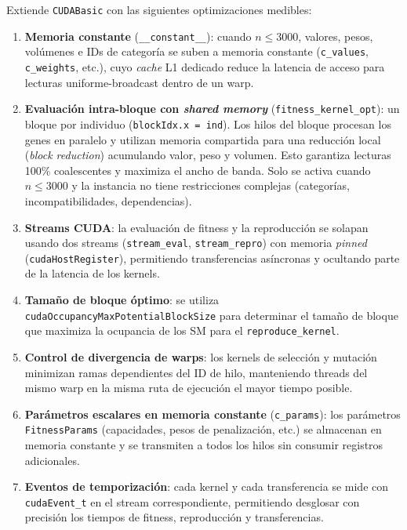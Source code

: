Extiende \texttt{CUDABasic} con las siguientes optimizaciones medibles:

\begin{enumerate}
  \item \textbf{Memoria constante} (\texttt{\_\_constant\_\_}): cuando $n \leq 3000$,
    valores, pesos, volúmenes e IDs de categoría se suben a memoria constante
    (\texttt{c\_values}, \texttt{c\_weights}, etc.), cuyo \emph{cache} L1 dedicado
    reduce la latencia de acceso para lecturas uniforme-broadcast dentro de un warp.
  \item \textbf{Evaluación intra-bloque con \emph{shared memory}} 
    (\texttt{fitness\_kernel\_opt}): un bloque por individuo
    (\texttt{blockIdx.x = ind}). Los hilos del bloque procesan los genes en paralelo
    y utilizan memoria compartida para una reducción local (\emph{block reduction})
    acumulando valor, peso y volumen. Esto garantiza lecturas 100\% coalescentes y
    maximiza el ancho de banda. Solo se activa cuando $n \leq 3000$ y la instancia
    no tiene restricciones complejas (categorías, incompatibilidades, dependencias).
  \item \textbf{Streams CUDA}: la evaluación de fitness y la reproducción se solapan
    usando dos streams (\texttt{stream\_eval}, \texttt{stream\_repro}) con memoria
    \emph{pinned} (\texttt{cudaHostRegister}), permitiendo transferencias asíncronas
    y ocultando parte de la latencia de los kernels.
  \item \textbf{Tamaño de bloque óptimo}: se utiliza
    \texttt{cudaOccupancyMaxPotentialBlockSize} para determinar el tamaño de bloque
    que maximiza la ocupancia de los SM para el \texttt{reproduce\_kernel}.
  \item \textbf{Control de divergencia de warps}: los kernels de selección y mutación
    minimizan ramas dependientes del ID de hilo, manteniendo threads del mismo warp
    en la misma ruta de ejecución el mayor tiempo posible.
  \item \textbf{Parámetros escalares en memoria constante} (\texttt{c\_params}):
    los parámetros \texttt{FitnessParams} (capacidades, pesos de penalización, etc.)
    se almacenan en memoria constante y se transmiten a todos los hilos sin consumir
    registros adicionales.
  \item \textbf{Eventos de temporización}: cada kernel y cada transferencia se mide
    con \texttt{cudaEvent\_t} en el stream correspondiente, permitiendo desglosar
    con precisión los tiempos de fitness, reproducción y transferencias.
\end{enumerate}
